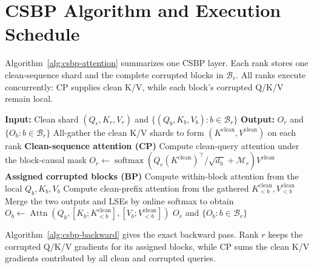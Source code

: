 \clearpage
\section{CSBP Algorithm and Execution Schedule}
\label{app:execution-schedule}

Algorithm~\ref{alg:csbp-attention} summarizes one CSBP layer. Each rank stores
one clean-sequence shard and the complete corrupted blocks in $\mathcal B_r$.
All ranks execute concurrently: CP supplies clean K/V, while each block's
corrupted Q/K/V remain local.

\begin{algorithm}[H]
\small
\caption{CSBP forward pass on rank $r$}
\label{alg:csbp-attention}
\begin{algorithmic}[1]
\State \textbf{Input:} Clean shard $(Q_r,K_r,V_r)$ and
  $\{(Q_b,K_b,V_b):b\in\mathcal B_r\}$
\State \textbf{Output:} $O_r$ and $\{O_b:b\in\mathcal B_r\}$
\State All-gather the clean K/V shards to form
  $(K^{\mathrm{clean}},V^{\mathrm{clean}})$ on each rank
\Statex
\State \textbf{Clean-sequence attention (CP)}
\State Compute clean-query attention under the block-causal mask
\State $O_r\gets\operatorname{softmax}\!\left(
  Q_r(K^{\mathrm{clean}})^\top/\sqrt{d_h}+\mathcal M_r\right)
  V^{\mathrm{clean}}$
\Statex
\State \textbf{Assigned corrupted blocks (BP)}
  \State Compute within-block attention from the local $Q_b,K_b,V_b$
  \State Compute clean-prefix attention from the gathered
    $K_{<b}^{\mathrm{clean}},V_{<b}^{\mathrm{clean}}$
  \State Merge the two outputs and LSEs by online softmax to obtain
  \State $O_b\gets\operatorname{Attn}\!\left(
    Q_b,[K_b;K_{<b}^{\mathrm{clean}}],
    [V_b;V_{<b}^{\mathrm{clean}}]\right)$
\EndFor
\State \Return $O_r$ and $\{O_b:b\in\mathcal B_r\}$
\end{algorithmic}
\end{algorithm}

Algorithm~\ref{alg:csbp-backward} gives the exact backward pass. Rank $r$
keeps the corrupted Q/K/V gradients for its assigned blocks, while CP sums the
clean K/V gradients contributed by all clean and corrupted queries.


